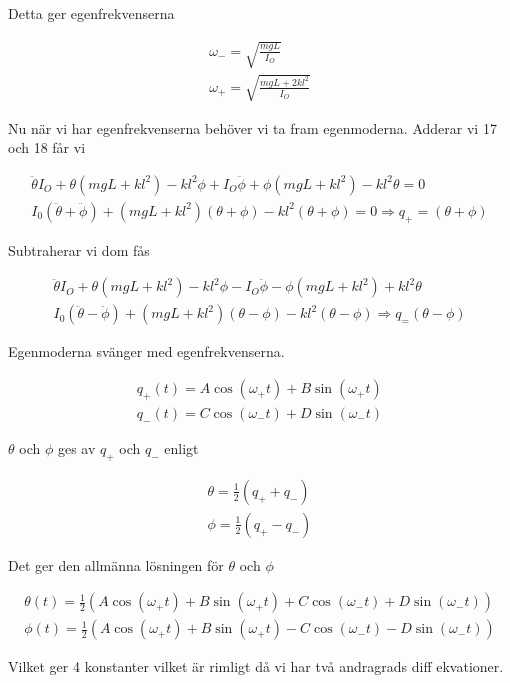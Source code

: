 \documentclass[a4paper]{article}
\begin{document}
Detta ger egenfrekvenserna

\begin{align}
    \omega_- = \sqrt{\frac{mgL}{I_O}} \\
    \omega_+ = \sqrt{\frac{mgL + 2kl^2}{I_O}}
\end{align}

Nu när vi har egenfrekvenserna behöver vi ta fram egenmoderna. Adderar vi 17 och 18 får vi

\begin{align}
    \ddot{\theta}I_O + \theta(mgL+kl^2) - kl^2 \phi + I_O\ddot{\phi} + \phi (mgL+kl^2) - kl^2 \theta = 0 \\
    I_0(\ddot{\theta} + \ddot{\phi}) + (mgL+kl^2)(\theta+ \phi) - kl^2(\theta + \phi) = 0 \Rightarrow q_+ = (\theta + \phi)
\end{align}

Subtraherar vi dom fås

\begin{align}
    \ddot{\theta}I_O + \theta(mgL+kl^2) - kl^2 \phi - I_O\ddot{\phi} - \phi (mgL+kl^2) + kl^2 \theta \\
    I_0(\ddot{\theta}-\ddot{\phi}) + (mgL+kl^2)(\theta - \phi) - kl^2(\theta - \phi) \Rightarrow q_ = (\theta-\phi)
\end{align}

Egenmoderna svänger med egenfrekvenserna.

\begin{align}
    q_+(t) = A\cos(\omega_+ t) + B\sin(\omega_+ t) \\
    q_-(t) = C\cos(\omega_- t) + D\sin(\omega_- t)
\end{align}

$\theta$ och $\phi$ ges av $q_+$ och $q_-$ enligt

\begin{align}
    \theta = \frac{1}{2}(q_+ + q_-)\\
    \phi = \frac{1}{2}(q_+ - q_-)
\end{align}

Det ger den allmänna lösningen för $\theta$ och $\phi$

\begin{align}
    \theta(t) = \frac{1}{2}(A\cos(\omega_+ t) + B\sin(\omega_+ t) + C\cos(\omega_- t) + D\sin(\omega_- t))\\
    \phi(t) = \frac{1}{2}(A\cos(\omega_+ t) + B\sin(\omega_+ t) - C\cos(\omega_- t) - D\sin(\omega_- t))
\end{align}

Vilket ger 4 konstanter vilket är rimligt då vi har två andragrads diff ekvationer. 
\end{document}

